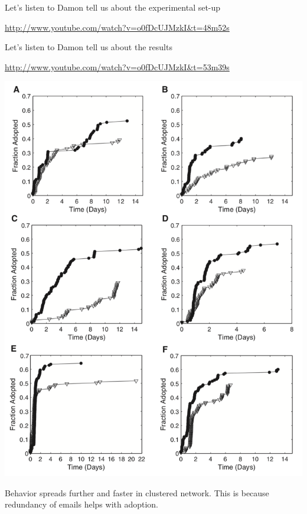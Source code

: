\documentclass[aspectratio=169]{beamer}
\begin{document}
\begin{frame}

Let's listen to Damon tell us about the experimental set-up

\url{http://www.youtube.com/watch?v=o0fDcUJMzkI&t=48m52s}

\end{frame}
\begin{frame}

Let's listen to Damon tell us about the results

\url{http://www.youtube.com/watch?v=o0fDcUJMzkI&t=53m39s}

\end{frame}
\begin{frame}

\begin{center}
\includegraphics[height=0.8\textheight]{figures/centola_spread_2010_fig2}
\end{center}

\vfill
Behavior spreads further and faster in clustered network. This is because redundancy of emails helps with adoption.

\end{frame}
\end{document}
